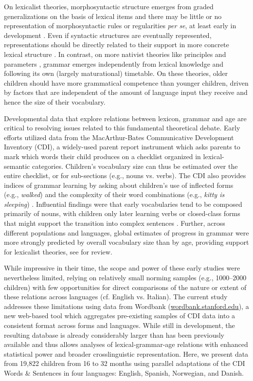 \documentclass[10pt,letterpaper]{article}
\begin{document}
On lexicalist theories, morphosyntactic structure emerges from graded generalizations on the basis of lexical items and there may be little or no representation of morphosyntactic rules or regularities \emph{per se}, at least early in development \cite{tomasello2003}. Even if syntactic structures are eventually represented, representations should be directly related to their support in more concrete lexical structure \cite{bannard2009}. In contrast, on more nativist theories like principles and parameters \cite{chomsky1981, baker2005}, grammar emerges independently from lexical knowledge and following its own (largely maturational) timetable. On these theories, older children should have more grammatical competence than younger children, driven by factors that are independent of the amount of language input they receive and hence the size of their vocabulary.

Developmental data that explore relations between lexicon, grammar and age are critical to resolving issues related to this fundamental theoretical debate.  Early efforts utilized data from the MacArthur-Bates Communicative Development Inventory (CDI), a widely-used parent report instrument which asks parents to mark which words their child produces on a checklist organized in lexical-semantic categories. Children's vocabulary size can thus be estimated over the entire checklist, or for sub-sections (e.g., nouns vs. verbs). The CDI also provides indices of grammar learning by asking about children's use of inflected forms (e.g., \emph{walked}) and the complexity of their word combinations (e.g., \emph{kitty is sleeping}) \cite{bates1997,caselli1999}.  Influential findings were that early vocabularies tend to be composed primarily of nouns, with children only later learning verbs or closed-class forms that might support the transition into complex sentences \cite{bates1994}. Further, across different populations and languages, global estimates of progress in grammar were more strongly predicted by overall vocabulary size than by age, providing support for lexicalist theories, see \cite{bates1999} for review. 


While impressive in their time, the scope and power of these early studies were nevertheless limited, relying on relatively small norming samples (e.g., 1000--2000 children) with few opportunities for direct comparisons of the nature or extent of these relations across languages (cf. English vs. Italian). The current study addresses these limitations using data from Wordbank (\url{wordbank.stanford.edu}), a new web-based tool which aggregates pre-existing samples of CDI data into a consistent format across forms and languages. While still in development, the resulting database is already considerably larger than has been previously available and thus allows analyses of lexical-grammar-age relations with enhanced statistical power and broader crosslinguistic representation. Here, we present data from 19,822 children from 16 to 32 months using parallel adaptations of the CDI Words \& Sentences in four languages: English, Spanish, Norwegian, and Danish.
\end{document}
